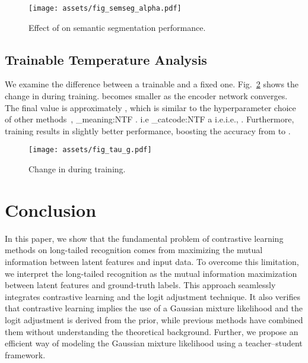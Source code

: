 \documentclass{article}
\makeatletter
\theoremstyle{plain}
\theoremstyle{definition}
\theoremstyle{remark}
\newcommand\latinabbrev[1]{
  \peek_meaning:NTF . {#1\@}{ \peek_catcode:NTF a {#1.\@ }{#1.\@}}}
\def\ie{\latinabbrev{i.e}}
\makeatother
\begin{document}
\begin{figure}[t]
    \centering
    \texttt{[image: assets/fig\_semseg\_alpha.pdf]}
    \vspace{-7mm}
    \caption{Effect of  on semantic segmentation performance.}
    \label{fig:semseg_alpha}
\end{figure}


\subsection{Trainable Temperature Analysis} \label{sec:trainable_temperature}
We examine the difference between a trainable  and a fixed one. Fig.~\ref{fig:tau_g} shows the change in  during training.  becomes smaller as the encoder network converges. The final value is approximately , which is similar to the hyperparameter choice of other methods~\cite{he2020momentum,tian2020contrastive,zhu2022balanced}, \ie, . Furthermore, training  results in slightly better performance, boosting the accuracy from  to .

\begin{figure}[t]
    \centering
    \texttt{[image: assets/fig\_tau\_g.pdf]}
    \vspace{-7mm}
    \caption{Change in  during training.}
    \label{fig:tau_g}
\end{figure}
 \section{Conclusion}

In this paper, we show that the fundamental problem of contrastive learning methods on long-tailed recognition comes from maximizing the mutual information between latent features and input data. To overcome this limitation, we interpret the long-tailed recognition as the mutual information maximization between latent features and ground-truth labels. This approach seamlessly integrates contrastive learning and the logit adjustment technique. It also verifies that contrastive learning implies the use of a Gaussian mixture likelihood and the logit adjustment is derived from the prior, while previous methods have combined them without understanding the theoretical background. Further, we propose an efficient way of modeling the Gaussian mixture likelihood using a teacher--student framework.
\end{document}
